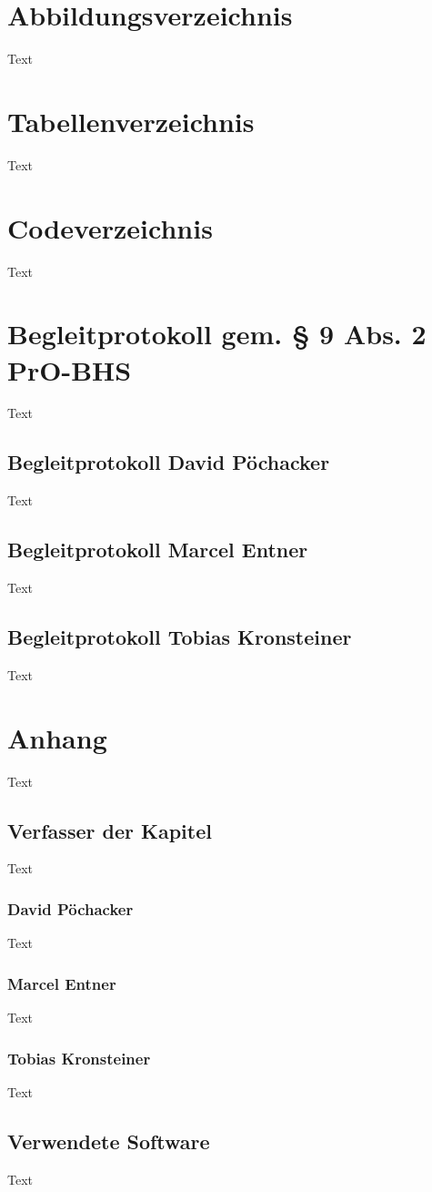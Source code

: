 \chapter{Abbildungsverzeichnis}
Text
\chapter{Tabellenverzeichnis}
Text
\chapter{Codeverzeichnis}
Text


\chapter{Begleitprotokoll gem. § 9 Abs. 2 PrO-BHS}
Text
\section{Begleitprotokoll David Pöchacker}
Text
\section{Begleitprotokoll Marcel Entner}
Text
\section{Begleitprotokoll Tobias Kronsteiner}
Text



\chapter{Anhang}
Text

\section{Verfasser der Kapitel}
Text
\subsection{David Pöchacker}
Text
\subsection{Marcel Entner}
Text
\subsection{Tobias Kronsteiner}
Text


\section{Verwendete Software}
Text
